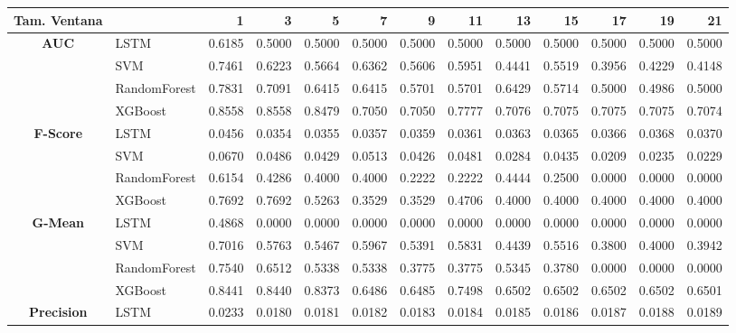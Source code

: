 \begin{table}[h]
	\centering
	\begin{adjustbox}{max width=15cm}
		\begin{tabular}{|c|l|r|r|r|r|r|r|r|r|r|r|r|}
			\hline
			\textbf{Tam. Ventana} &         &      1  &      3  &      5  &      7  &      9  &      11 &      13 &      15 &      17 &      19 &      21 \\
			\hline
			\textbf{AUC} & LSTM &  0.6185 &  0.5000 &  0.5000 &  0.5000 &  0.5000 &  0.5000 &  0.5000 &  0.5000 &  0.5000 &  0.5000 &  0.5000 \\
			& SVM &  0.7461 &  0.6223 &  0.5664 &  0.6362 &  0.5606 &  0.5951 &  0.4441 &  0.5519 &  0.3956 &  0.4229 &  0.4148 \\
			& RandomForest &  0.7831 &  0.7091 &  0.6415 &  0.6415 &  0.5701 &  0.5701 &  0.6429 &  0.5714 &  0.5000 &  0.4986 &  0.5000 \\
			& XGBoost &  0.8558 &  0.8558 &  0.8479 &  0.7050 &  0.7050 &  0.7777 &  0.7076 &  0.7075 &  0.7075 &  0.7075 &  0.7074 \\
			\hline
			\textbf{F-Score} & LSTM &  0.0456 &  0.0354 &  0.0355 &  0.0357 &  0.0359 &  0.0361 &  0.0363 &  0.0365 &  0.0366 &  0.0368 &  0.0370 \\
			& SVM &  0.0670 &  0.0486 &  0.0429 &  0.0513 &  0.0426 &  0.0481 &  0.0284 &  0.0435 &  0.0209 &  0.0235 &  0.0229 \\
			& RandomForest &  0.6154 &  0.4286 &  0.4000 &  0.4000 &  0.2222 &  0.2222 &  0.4444 &  0.2500 &  0.0000 &  0.0000 &  0.0000 \\
			& XGBoost &  0.7692 &  0.7692 &  0.5263 &  0.3529 &  0.3529 &  0.4706 &  0.4000 &  0.4000 &  0.4000 &  0.4000 &  0.4000 \\
			\hline
			\textbf{G-Mean} & LSTM &  0.4868 &  0.0000 &  0.0000 &  0.0000 &  0.0000 &  0.0000 &  0.0000 &  0.0000 &  0.0000 &  0.0000 &  0.0000 \\
			& SVM &  0.7016 &  0.5763 &  0.5467 &  0.5967 &  0.5391 &  0.5831 &  0.4439 &  0.5516 &  0.3800 &  0.4000 &  0.3942 \\
			& RandomForest &  0.7540 &  0.6512 &  0.5338 &  0.5338 &  0.3775 &  0.3775 &  0.5345 &  0.3780 &  0.0000 &  0.0000 &  0.0000 \\
			& XGBoost &  0.8441 &  0.8440 &  0.8373 &  0.6486 &  0.6485 &  0.7498 &  0.6502 &  0.6502 &  0.6502 &  0.6502 &  0.6501 \\
			\hline
			\textbf{Precision} & LSTM &  0.0233 &  0.0180 &  0.0181 &  0.0182 &  0.0183 &  0.0184 &  0.0185 &  0.0186 &  0.0187 &  0.0188 &  0.0189 \\

\end{tabular}
\end{adjustbox}
\end{table}

